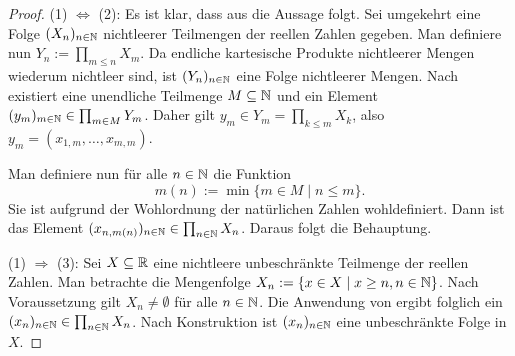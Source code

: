 \begin{proof}
  (1) $\Leftrightarrow$ (2):
  Es ist klar, dass aus \CCR die Aussage \PCCR folgt.
  Sei umgekehrt eine Folge $(X_n)_{n \in \mathbb{N}}$ nichtleerer Teilmengen der reellen Zahlen gegeben.
  Man definiere nun $Y_n := \prod_{m \leq n} X_m$.
  Da endliche kartesische Produkte nichtleerer Mengen wiederum nichtleer sind, ist $(Y_n)_{n \in \mathbb{N}}$ eine Folge nichtleerer Mengen.
  Nach \PCCR existiert eine unendliche Teilmenge $M \subseteq \mathbb{N}$ und ein Element $(y_m)_{m \in \mathbb{N}} \in \prod_{m \in M} Y_m$.
  Daher gilt $y_m \in Y_m = \prod_{k \leq m} X_k$, also $y_m = (x_{1,m},\dots,x_{m,m})$.

  Man definiere nun für alle $n \in \mathbb{N}$ die Funktion
  \begin{displaymath}
    m(n) := \min\{m \in M \mid n \leq m\}.
  \end{displaymath}
  Sie ist aufgrund der Wohlordnung der natürlichen Zahlen wohldefiniert.
  Dann ist das Element $(x_{n,m(n)})_{n \in \mathbb{N}} \in \prod_{n \in \mathbb{N}} X_n$.
  Daraus folgt die Behauptung.

  (1) $\Rightarrow$ (3):
  Sei $X \subseteq \mathbb{R}$ eine nichtleere unbeschränkte Teilmenge der reellen Zahlen.
  Man betrachte die Mengenfolge $X_n := \{x \in X \mid x \geq n, n \in \mathbb{N}\}$.
  Nach Voraussetzung gilt $X_n \neq \emptyset$ für alle $n \in \mathbb{N}$.
  Die Anwendung von \CCR ergibt folglich ein $(x_n)_{n \in \mathbb{N}} \in \prod_{n \in \mathbb{N}} X_n$.
  Nach Konstruktion ist $(x_n)_{n \in \mathbb{N}}$ eine unbeschränkte Folge in $X$.


\end{proof}
